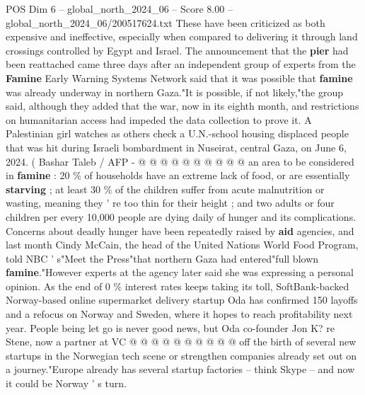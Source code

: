 \begin{textsample}{POS Dim 6 – global\_north\_2024\_06 – Score 8.00 – global\_north\_2024\_06/200517624.txt}
These have been criticized as both expensive and ineffective, especially when compared to delivering it through land crossings controlled by Egypt and Israel.
The announcement that the \textbf{pier} had been reattached came three days after an independent group of experts from the \textbf{Famine} Early Warning Systems Network said that it was possible that \textbf{famine} was already underway in northern Gaza."It is possible, if not likely,"the group said, although they added that the war, now in its eighth month, and restrictions on humanitarian access had impeded the data collection to prove it.
A Palestinian girl watches as others check a U.N.-school housing displaced people that was hit during Israeli bombardment in Nuseirat, central Gaza, on June 6, 2024. ( Bashar Taleb / AFP - @ @ @ @ @ @ @ @ @ @ an area to be considered in \textbf{famine} : 20 \% of households have an extreme lack of food, or are essentially \textbf{starving} ; at least 30 \% of the children suffer from acute malnutrition or wasting, meaning they ' re too thin for their height ; and two adults or four children per every 10,000 people are dying daily of hunger and its complications.
Concerns about deadly hunger have been repeatedly raised by \textbf{aid} agencies, and last month Cindy McCain, the head of the United Nations World Food Program, told NBC ' s"Meet the Press"that northern Gaza had entered"full blown \textbf{famine}."However experts at the agency later said she was expressing a personal opinion.
As the end of 0 \% interest rates keeps taking its toll, SoftBank-backed Norway-based online supermarket delivery startup Oda has confirmed 150 layoffs and a refocus on Norway and Sweden, where it hopes to reach profitability next year.
People being let go is never good news, but Oda co-founder Jon K? re Stene, now a partner at VC @ @ @ @ @ @ @ @ @ @ off the birth of several new startups in the Norwegian tech scene or strengthen companies already set out on a journey."Europe already has several startup factories -- think Skype -- and now it could be Norway ' s turn.

\end{textsample}
